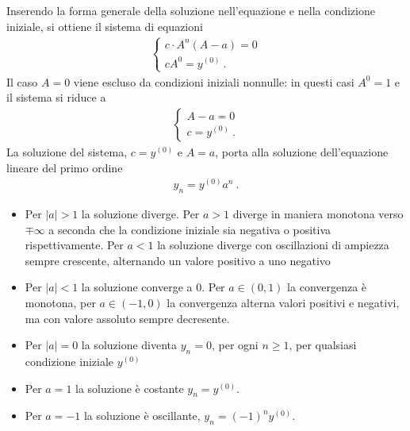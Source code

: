\documentclass[letterpaper,10pt,italian]{jupyterBook}
\begin{document}
\sphinxAtStartPar
{} Inserendo la forma generale della soluzione nell’equazione e nella condizione iniziale, si ottiene il sistema di equazioni
\begin{equation*}
\begin{split}\begin{cases}
  c \cdot A^{n} ( A - a ) = 0 \\
  c A^0 = y^{(0)} \ .
\end{cases}\end{split}
\end{equation*}
\sphinxAtStartPar
Il caso \(A = 0\) viene escluso da condizioni iniziali non\sphinxhyphen{}nulle: in questi casi \(A^0 = 1\) e il sistema si riduce a
\begin{equation*}
\begin{split}\begin{cases}
  A - a = 0 \\
  c  = y^{(0)} \ .
\end{cases}\end{split}
\end{equation*}
\sphinxAtStartPar
La soluzione del sistema, \(c = y^{(0)}\) e \(A = a\), porta alla soluzione dell’equazione lineare del primo ordine
\begin{equation*}
\begin{split}y_{n} = y^{(0)} a^{n} \ .\end{split}
\end{equation*}
\sphinxAtStartPar
{}
\begin{itemize}
\item {} 
\sphinxAtStartPar
Per \(|a| > 1\) la soluzione diverge. Per \(a > 1\) diverge in maniera monotona verso \(\mp \infty\) a seconda che la condizione iniziale sia negativa o positiva rispettivamente. Per \(a < 1\) la soluzione diverge con oscillazioni di ampiezza sempre crescente, alternando un valore positivo a uno negativo

\item {} 
\sphinxAtStartPar
Per \(|a| < 1\) la soluzione converge a \(0\). Per \(a \in (0,1)\) la convergenza è monotona, per \(a \in (-1,0)\) la convergenza alterna valori positivi e negativi, ma con valore assoluto sempre decresente.

\item {} 
\sphinxAtStartPar
Per \(|a| = 0\) la soluzione diventa \(y_n = 0\), per ogni \(n \ge 1\), per qualsiasi condizione iniziale \(y^{(0)}\)

\item {} 
\sphinxAtStartPar
Per \( a  = 1\) la soluzione è costante \(y_n = y^{(0)}\).

\item {} 
\sphinxAtStartPar
Per \( a  =-1\) la soluzione è oscillante, \(y_n = (-1)^n y^{(0)}\).

\end{itemize}
\end{document}
